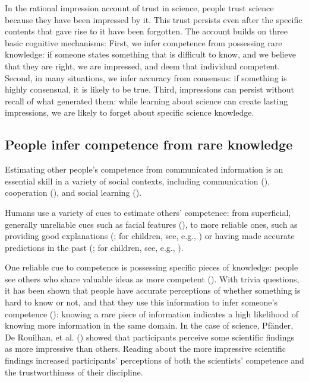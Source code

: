 \documentclass[
  jou,
  floatsintext,
  longtable,
  nolmodern,
  notxfonts,
  notimes,
  colorlinks=true,linkcolor=blue,citecolor=blue,urlcolor=blue]{apa7}
\begin{document}
In the rational impression account of trust in science, people trust
science because they have been impressed by it. This trust persists even
after the specific contents that gave rise to it have been forgotten.
The account builds on three basic cognitive mechanisms: First, we infer
competence from possessing rare knowledge: if someone states something
that is difficult to know, and we believe that they are right, we are
impressed, and deem that individual competent. Second, in many
situations, we infer accuracy from consensus: if something is highly
consensual, it is likely to be true. Third, impressions can persist
without recall of what generated them: while learning about science can
create lasting impressions, we are likely to forget about specific
science knowledge.

\subsection{People infer competence from rare
knowledge}\label{people-infer-competence-from-rare-knowledge}

Estimating other people's competence from communicated information is an
essential skill in a variety of social contexts, including communication
(),
cooperation (), and social learning
().

Humans use a variety of cues to estimate others' competence: from
superficial, generally unreliable cues such as facial features
(), to more reliable ones, such as providing good explanations
(;
for children, see, e.g.,
) or having made accurate predictions in the past
(; for children, see, e.g.,
).

One reliable cue to competence is possessing specific pieces of
knowledge: people see others who share valuable ideas as more competent
(). With trivia
questions, it has been shown that people have accurate perceptions of
whether something is hard to know or not, and that they use this
information to infer someone's competence
():
knowing a rare piece of information indicates a high likelihood of
knowing more information in the same domain. In the case of science,
Pfänder, De Rouilhan, et al.
() showed
that participants perceive some scientific findings as more impressive
than others. Reading about the more impressive scientific findings
increased participants' perceptions of both the scientists' competence
and the trustworthiness of their discipline.
\end{document}
